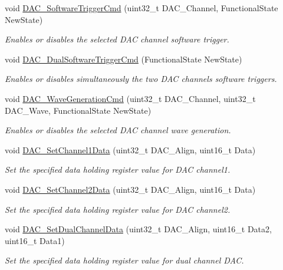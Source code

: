 \begin{DoxyCompactItemize}
void \hyperlink{group___d_a_c___group1_ga46f9f7f6b9520a86e300fe966afe5fb3}{D\-A\-C\-\_\-\-Software\-Trigger\-Cmd} (uint32\-\_\-t D\-A\-C\-\_\-\-Channel, Functional\-State New\-State)
\begin{DoxyCompactList}\small\item\em Enables or disables the selected D\-A\-C channel software trigger. \end{DoxyCompactList}\item 
void \hyperlink{group___d_a_c___group1_gab4d3b364a6b184dcd65f3b294ebf56dc}{D\-A\-C\-\_\-\-Dual\-Software\-Trigger\-Cmd} (Functional\-State New\-State)
\begin{DoxyCompactList}\small\item\em Enables or disables simultaneously the two D\-A\-C channels software triggers. \end{DoxyCompactList}\item 
void \hyperlink{group___d_a_c___group1_gabd51ae6880821d4dcd923969ec19a19e}{D\-A\-C\-\_\-\-Wave\-Generation\-Cmd} (uint32\-\_\-t D\-A\-C\-\_\-\-Channel, uint32\-\_\-t D\-A\-C\-\_\-\-Wave, Functional\-State New\-State)
\begin{DoxyCompactList}\small\item\em Enables or disables the selected D\-A\-C channel wave generation. \end{DoxyCompactList}\item 
void \hyperlink{group___d_a_c___group1_gad06b4230d2b17d1d13f41dce4c782461}{D\-A\-C\-\_\-\-Set\-Channel1\-Data} (uint32\-\_\-t D\-A\-C\-\_\-\-Align, uint16\-\_\-t Data)
\begin{DoxyCompactList}\small\item\em Set the specified data holding register value for D\-A\-C channel1. \end{DoxyCompactList}\item 
void \hyperlink{group___d_a_c___group1_ga44e12006ec186791378d132da8541552}{D\-A\-C\-\_\-\-Set\-Channel2\-Data} (uint32\-\_\-t D\-A\-C\-\_\-\-Align, uint16\-\_\-t Data)
\begin{DoxyCompactList}\small\item\em Set the specified data holding register value for D\-A\-C channel2. \end{DoxyCompactList}\item 
void \hyperlink{group___d_a_c___group1_ga4ca2cfdf56ab35a23f2517f23d7fbb24}{D\-A\-C\-\_\-\-Set\-Dual\-Channel\-Data} (uint32\-\_\-t D\-A\-C\-\_\-\-Align, uint16\-\_\-t Data2, uint16\-\_\-t Data1)
\begin{DoxyCompactList}\small\item\em Set the specified data holding register value for dual channel D\-A\-C. \end{DoxyCompactList}\item 

\end{DoxyCompactItemize}
